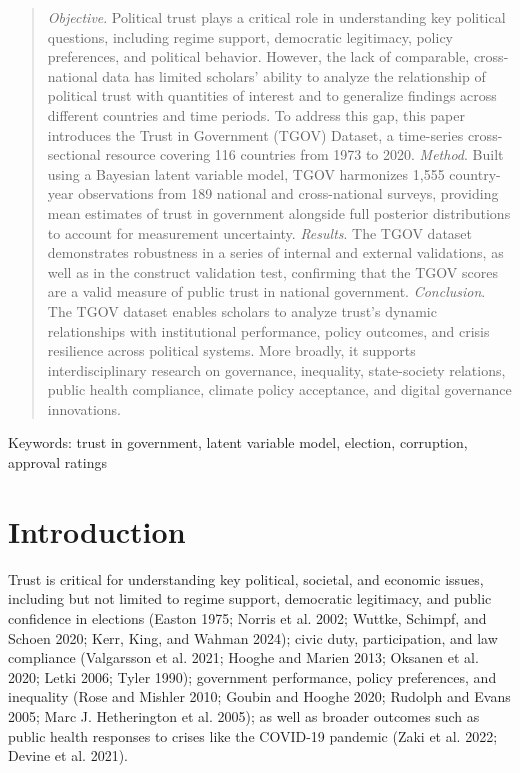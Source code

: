 \documentclass[
  12pt,
]{article}
\begin{document}
\begin{abstract}
 

\emph{Objective}. Political trust plays a critical role in understanding key political questions, including regime support, democratic legitimacy, policy preferences, and political behavior. However, the lack of comparable, cross-national data has limited scholars' ability to analyze the relationship of political trust with quantities of interest and to generalize findings across different countries and time periods. To address this gap, this paper introduces the Trust in Government (TGOV) Dataset, a time-series cross-sectional resource covering 116 countries from 1973 to 2020. \emph{Method}. Built using a Bayesian latent variable model, TGOV harmonizes 1,555 country-year observations from 189 national and cross-national surveys, providing mean estimates of trust in government alongside full posterior distributions to account for measurement uncertainty. \emph{Results}. The TGOV dataset demonstrates robustness in a series of internal and external validations, as well as in the construct validation test, confirming that the TGOV scores are a valid measure of public trust in national government. \emph{Conclusion}. The TGOV dataset enables scholars to analyze trust’s dynamic relationships with institutional performance, policy outcomes, and crisis resilience across political systems. More broadly, it supports interdisciplinary research on governance, inequality, state-society relations, public health compliance, climate policy acceptance, and digital governance innovations.

\end{abstract}

Keywords: trust in government, latent variable model, election, corruption, approval ratings

\pagebreak


\section{Introduction}\label{introduction}

Trust is critical for understanding key political, societal, and economic issues, including but not limited to regime support, democratic legitimacy, and public confidence in elections (Easton 1975; Norris et al. 2002; Wuttke, Schimpf, and Schoen 2020; Kerr, King, and Wahman 2024); civic duty, participation, and law compliance (Valgarsson et al. 2021; Hooghe and Marien 2013; Oksanen et al. 2020; Letki 2006; Tyler 1990); government performance, policy preferences, and inequality (Rose and Mishler 2010; Goubin and Hooghe 2020; Rudolph and Evans 2005; Marc J. Hetherington et al. 2005); as well as broader outcomes such as public health responses to crises like the COVID-19 pandemic (Zaki et al. 2022; Devine et al. 2021).
\end{document}
